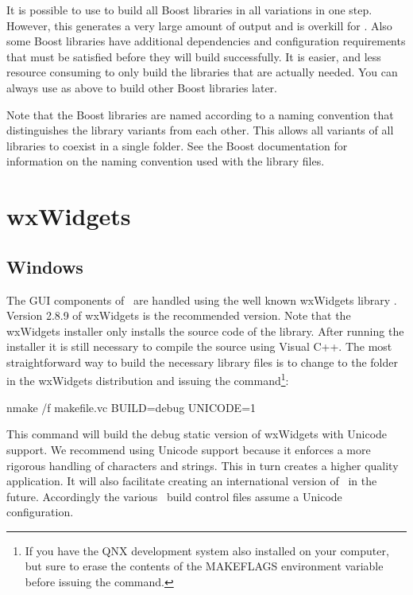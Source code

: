 It is possible to use  to build all Boost libraries in all variations in one step. However, this generates a very large amount of output and is overkill for \VTank. Also some Boost libraries have additional dependencies and configuration requirements that must be satisfied before they will build successfully. It is easier, and less resource consuming to only build the libraries that are actually needed. You can always use  as above to build other Boost libraries later.

Note that the Boost libraries are named according to a naming convention that distinguishes the library variants from each other. This allows all variants of all libraries to coexist in a single folder. See the Boost documentation for information on the naming convention used with the library files.

\section{wxWidgets}

\subsection{Windows}

The GUI components of \MapEditor\ are handled using the well known wxWidgets library \cite{wxWidgets}. Version 2.8.9 of wxWidgets is the recommended version. Note that the wxWidgets installer only installs the source code of the library. After running the installer it is still necessary to compile the source using Visual C++. The most straightforward way to build the necessary library files is to change to the  folder in the wxWidgets distribution and issuing the command\footnote{If you have the QNX development system also installed on your computer, but sure to erase the contents of the MAKEFLAGS environment variable before issuing the  command.}:

\begin{commands}
nmake /f makefile.vc BUILD=debug UNICODE=1
\end{commands}

This command will build the debug static version of wxWidgets with Unicode support. We recommend using Unicode support because it enforces a more rigorous handling of characters and strings. This in turn creates a higher quality application. It will also facilitate creating an international version of \MapEditor\ in the future. Accordingly the various \MapEditor\ build control files assume a Unicode configuration.


